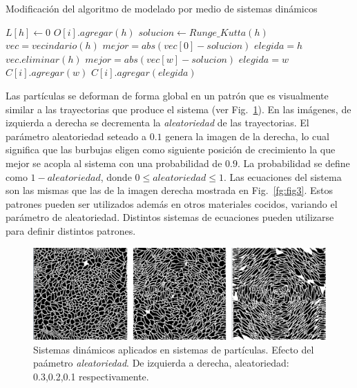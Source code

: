 \documentclass[oneside,a4paper,spanish,links]{amca}
\begin{document}
\begin{algorithm}[h!]
\caption{Modificación del algoritmo de modelado por medio de sistemas dinámicos}
\begin{algorithmic}
\State $L[h]\gets 0$ 
\State $O[i].agregar(h)$
\State $solucion \gets Runge\_Kutta(h)$
\State $vec = vecindario(h)$
\State $mejor = abs(vec[0] - solucion)$
\State $elegida = h$
\State $vec.eliminar(h)$
        \State $mejor = abs(vec[w]-solucion)$
        \State $elegida = w$
    \EndIf
        \State $C[i].agregar(w)$
    \EndIf
\EndFor
{}
\State $C[i].agregar(elegida)$
\end{algorithmic}
\end{algorithm}

Las part\'iculas se deforman de forma global en un patr\'on que es visualmente similar a las trayectorias que produce el sistema (ver Fig.~\ref{fg:fig4}). En las im\'agenes, de izquierda a derecha se decrementa la {\em aleatoriedad} de las trayectorias. El par\'ametro aleatoriedad seteado a $0.1$ genera la imagen de la derecha, lo cual significa que las burbujas eligen como siguiente posición de crecimiento la que mejor se acopla al sistema con una probabilidad de $0.9$. La probabilidad se define como $1-aleatoriedad$, donde $0 \leq aleatoriedad \leq 1$. Las ecuaciones del sistema son las mismas que las de la imagen derecha mostrada en Fig.~\ref{fg:fig3}. Estos patrones pueden ser utilizados adem\'as en otros materiales cocidos, variando el par\'ametro de aleatoriedad. Distintos sistemas de ecuaciones pueden utilizarse para definir distintos patrones.

\begin{figure}[htb!]
  \centerline{\includegraphics[scale=0.21]{fig4}}
  \caption{Sistemas din\'amicos aplicados en sistemas de part\'iculas. Efecto del pa\'ametro {\em aleatoriedad}. De izquierda a derecha, aleatoriedad: 0.3,0.2,0.1 respectivamente. }
  \label{fg:fig4}
\end{figure}
\end{document}
